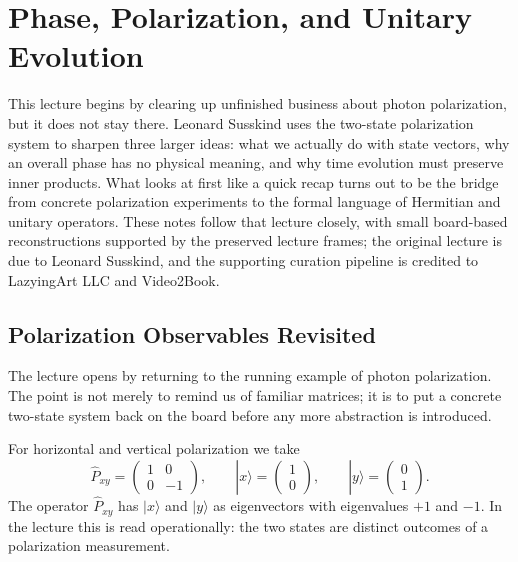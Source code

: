 \chapter{Phase, Polarization, and Unitary Evolution}

This lecture begins by clearing up unfinished business about photon polarization, but it does not stay there. Leonard Susskind uses the two-state polarization system to sharpen three larger ideas: what we actually do with state vectors, why an overall phase has no physical meaning, and why time evolution must preserve inner products. What looks at first like a quick recap turns out to be the bridge from concrete polarization experiments to the formal language of Hermitian and unitary operators. These notes follow that lecture closely, with small board-based reconstructions supported by the preserved lecture frames; the original lecture is due to Leonard Susskind, and the supporting curation pipeline is credited to LazyingArt LLC and Video2Book.

\section{Polarization Observables Revisited}

The lecture opens by returning to the running example of photon polarization. The point is not merely to remind us of familiar matrices; it is to put a concrete two-state system back on the board before any more abstraction is introduced.

For horizontal and vertical polarization we take
\begin{equation}
\hat P_{xy}=
\begin{pmatrix}
1&0\\
0&-1
\end{pmatrix},
\qquad
|x\rangle=
\begin{pmatrix}
1\\
0
\end{pmatrix},
\qquad
|y\rangle=
\begin{pmatrix}
0\\
1
\end{pmatrix}.
\end{equation}
The operator $\hat P_{xy}$ has $|x\rangle$ and $|y\rangle$ as eigenvectors with eigenvalues $+1$ and $-1$. In the lecture this is read operationally: the two states are distinct outcomes of a polarization measurement.

